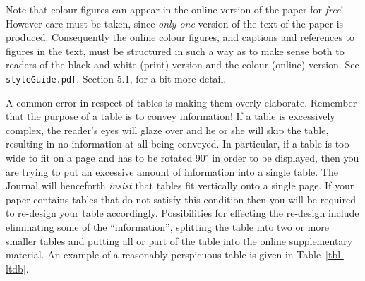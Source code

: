 \documentclass[
doublespace,
  times]{anzsauth}
\begin{document}
Note that colour figures can appear in the online version of the paper
for \emph{free}! However care must be taken, since \emph{only one}
version of the text of the paper is produced. Consequently the online
colour figures, and captions and references to figures in the text, must
be structured in such a way as to make sense both to readers of the
black-and-white (print) version and the colour (online) version. See
\texttt{styleGuide.pdf}, Section 5.1, for a bit more detail.

A common error in respect of tables is making them overly elaborate.
Remember that the purpose of a table is to convey information! If a
table is excessively complex, the reader's eyes will glaze over and he
or she will skip the table, resulting in no information at all being
conveyed. In particular, if a table is too wide to fit on a page and has
to be rotated 90\(^\circ\) in order to be displayed, then you are trying
to put an excessive amount of information into a single table. The
Journal will henceforth \emph{insist} that tables fit vertically onto a
single page. If your paper contains tables that do not satisfy this
condition then you will be required to re-design your table accordingly.
Possibilities for effecting the re-design include eliminating some of
the ``information'', splitting the table into two or more smaller tables
and putting all or part of the table into the online supplementary
material. An example of a reasonably perspicuous table is given in
Table~\ref{tbl-ltdb}.
\end{document}
